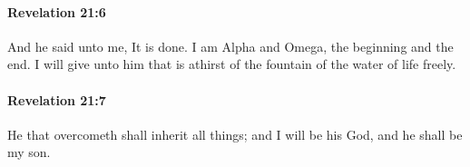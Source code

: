 		\paragraph{Revelation 21:6} %
			\label{REVELATIONNT-21-6}

			And he said unto me, It is done. I am Alpha and Omega, the beginning and the end. I will give unto him that is athirst of the fountain of the water of life freely.

			\begin{framed}
			\scriptsize
				\begin{compactdesc}
					\item[SBLG] 
				\end{compactdesc}
			\end{framed}

		\paragraph{Revelation 21:7} %
			\label{REVELATIONNT-21-7}

			He that overcometh shall inherit all things; and I will be his God, and he shall be my son.

